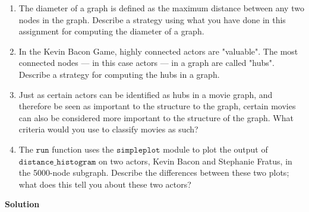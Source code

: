 \documentclass{article}
\begin{document}
\begin{enumerate}
    \item The diameter of a graph is defined as the maximum distance between any two nodes in the graph. Describe a strategy using what you have done in this assignment for computing the diameter of a graph.
    
    \item In the Kevin Bacon Game, highly connected actors are "valuable". The most connected nodes — in this case actors — in a graph are called "hubs". Describe a strategy for computing the hubs in a graph.
    
    \item Just as certain actors can be identified as hubs in a movie graph, and therefore be seen as important to the structure to the graph, certain movies can also be considered more important to the structure of the graph. What criteria would you use to classify movies as such?
    
    \item The $\texttt{run}$ function uses the $\texttt{simpleplot}$ module to plot the output of $\texttt{distance\_histogram}$ on two actors, Kevin Bacon and Stephanie Fratus, in the 5000-node subgraph. Describe the differences between these two plots; what does this tell you about these two actors?
\end{enumerate}
   
\textbf{Solution}
\end{document}
